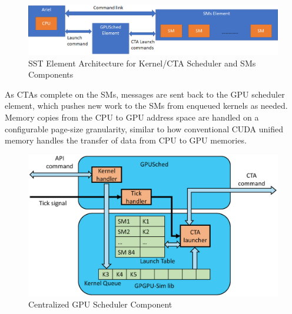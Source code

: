    \begin{figure}[!htb]
      \centering
      \setlength{\abovecaptionskip}{6pt plus 1pt minus 1pt}
      \includegraphics[width=.95\textwidth,keepaspectratio]{figures/sched.eps}
      \captionsetup{format=hang, justification=centering, width=1.0\textwidth}
      \caption{SST Element Architecture for Kernel/CTA Scheduler and SMs Components}
      \label{fig:gpu_sched}
   \end{figure}


As CTAs complete on the SMs, messages are sent back to the GPU scheduler
element, which pushes new work to the SMs from enqueued kernels as needed.
Memory copies from the CPU to GPU address space are handled on a configurable
page-size granularity, similar to how conventional CUDA unified memory handles
the transfer of data from CPU to GPU memories.


   \begin{figure}[!htb]
      \centering
      \setlength{\abovecaptionskip}{6pt plus 1pt minus 1pt}
      \includegraphics[width=.75\textwidth,keepaspectratio]{figures/scheduler.eps}
      \captionsetup{format=hang, justification=centering, width=.75\textwidth}
      \caption{Centralized GPU Scheduler Component}
      \label{fig:sched}
   \end{figure}


